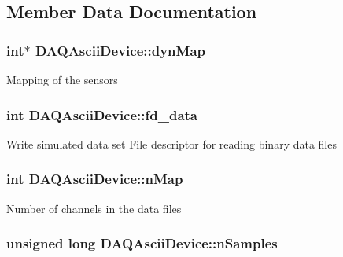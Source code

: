 \subsection{Member Data Documentation}
\hypertarget{classDAQAsciiDevice_a50307e0ce456fb3fe201f4acd0716058}{
\subsubsection[{dyn\-Map}]{\setlength{\rightskip}{0pt plus 5cm}int$\ast$ D\-A\-Q\-Ascii\-Device\-::dyn\-Map\hspace{0.3cm}{\ttfamily [protected]}}}\label{classDAQAsciiDevice_a50307e0ce456fb3fe201f4acd0716058}
Mapping of the sensors \hypertarget{classDAQAsciiDevice_aa683d088c84eeea43836ad7dbe804800}{
\subsubsection[{fd\-\_\-data}]{\setlength{\rightskip}{0pt plus 5cm}int D\-A\-Q\-Ascii\-Device\-::fd\-\_\-data\hspace{0.3cm}{\ttfamily [protected]}}}\label{classDAQAsciiDevice_aa683d088c84eeea43836ad7dbe804800}
Write simulated data set File descriptor for reading binary data files \hypertarget{classDAQAsciiDevice_a2dd49b3ae40e05dfd2e761f350d4320b}{
\subsubsection[{n\-Map}]{\setlength{\rightskip}{0pt plus 5cm}int D\-A\-Q\-Ascii\-Device\-::n\-Map\hspace{0.3cm}{\ttfamily [protected]}}}\label{classDAQAsciiDevice_a2dd49b3ae40e05dfd2e761f350d4320b}
Number of channels in the data files \hypertarget{classDAQAsciiDevice_ad7c5b15ad8e21ca0ecbf52afec874543}{
\subsubsection[{n\-Samples}]{\setlength{\rightskip}{0pt plus 5cm}unsigned long D\-A\-Q\-Ascii\-Device\-::n\-Samples\hspace{0.3cm}{\ttfamily [protected]}}}\label{classDAQAsciiDevice_ad7c5b15ad8e21ca0ecbf52afec874543}
